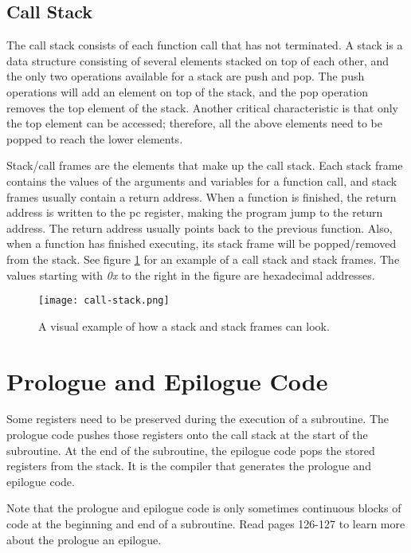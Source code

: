 \subsection{Call Stack}
\label{sec:callstack}
The call stack consists of each function call that has not terminated.
A stack is a data structure consisting of several elements stacked on top of each other, and the only two operations available for a stack are push and pop.
The push operations will add an element on top of the stack, and the pop operation removes the top element of the stack.
Another critical characteristic is that only the top element can be accessed; therefore, all the above elements need to be popped to reach the lower elements.



Stack/call frames are the elements that make up the call stack.
Each stack frame contains the values of the arguments and variables for a function call, and stack frames usually contain a return address.
When a function is finished, the return address is written to the \acrshort{pc} register, making the program jump to the return address.
The return address usually points back to the previous function.
Also, when a function has finished executing, its stack frame will be popped/removed from the stack.
See figure \ref{fig:callstack} for an example of a call stack and stack frames.
The values starting with \emph{0x} to the right in the figure are hexadecimal addresses.


\begin{figure}[!htb]
	\centering
	\texttt{[image: call-stack.png]}
	\caption{A visual example of how a stack and stack frames can look.}
	\label{fig:callstack}
\end{figure}



\section{Prologue and Epilogue Code}
Some registers need to be preserved during the execution of a subroutine.
The prologue code pushes those registers onto the call stack at the start of the subroutine.
At the end of the subroutine, the epilogue code pops the stored registers from the stack.
It is the compiler that generates the prologue and epilogue code.


Note that the prologue and epilogue code is only sometimes continuous blocks of code at the beginning and end of a subroutine. 
Read  \cite{dwarf} pages 126-127 to learn more about the prologue an epilogue.



